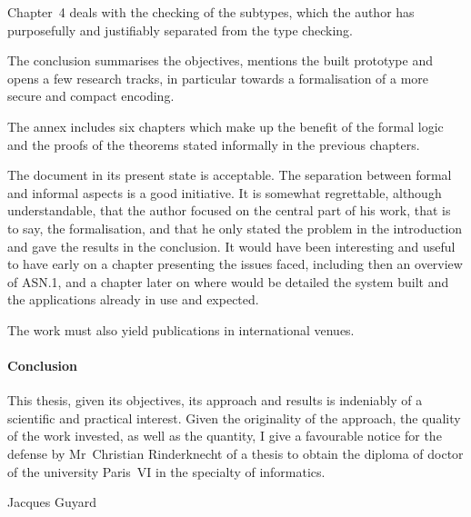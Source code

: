\documentclass[a4paper,11pt,twoside]{article}
\begin{document}
Chapter~4 deals with the checking of the subtypes, which the author
has purposefully and justifiably separated from the type checking.

The conclusion summarises the objectives, mentions the built prototype
and opens a few research tracks, in particular towards a formalisation
of a more secure and compact encoding.

The annex includes six chapters which make up the benefit of the
formal logic and the proofs of the theorems stated informally in the
previous chapters.

The document in its present state is acceptable. The separation
between formal and informal aspects is a good initiative. It is
somewhat regrettable, although understandable, that the author focused
on the central part of his work, that is to say, the formalisation,
and that he only stated the problem in the introduction and gave the
results in the conclusion. It would have been interesting and useful
to have early on a chapter presenting the issues faced, including then
an overview of ASN.1, and a chapter later on where would be detailed
the system built and the applications already in use and expected.

The work must also yield publications in international venues.

\paragraph{Conclusion} This thesis, given its objectives, its approach
and results is indeniably of a scientific and practical
interest. Given the originality of the approach, the quality of the
work invested, as well as the quantity, I give a favourable notice for
the defense by Mr~Christian Rinderknecht of a thesis to obtain the
diploma of doctor of the university Paris~VI in the specialty of
informatics.

\bigskip\bigskip

Jacques Guyard
\end{document}
